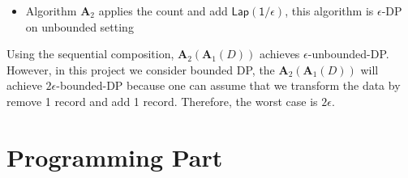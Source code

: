 \documentclass{article}
\renewcommand{\AA}{\mathbf{A}}
\begin{document}
\begin{enumerate}
{\begin{itemize}
			Algorithm  $\AA_1$ samples $10\%$ data uniformly at random, I assume that the algorithm is $0$-DP on unbounded setting.
			\item 
			Algorithm $\AA_2$ applies the count and add $\mathsf{Lap(1/\epsilon)}$, this algorithm is $\epsilon$-DP on unbounded setting
		\end{itemize}
		Using the sequential composition, $\AA_2(\AA_1(D))$ achieves $\epsilon$-unbounded-DP. However, in this project we consider bounded DP, the $\AA_2(\AA_1(D))$ will achieve $2\epsilon$-bounded-DP because one can assume that we transform the data by remove 1 record and add 1 record. Therefore, the worst case is $2\epsilon$. 
	}
\end{enumerate}
\section{Programming Part}
\end{document}

